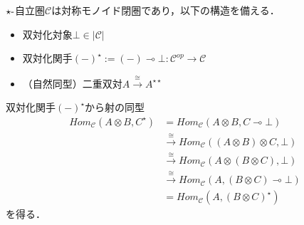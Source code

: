 \documentclass[type_judgement.tex]{subfiles}
\begin{document}

\begin{defn}
\label{def:star-auto}
$\star\mathchar`-$自立圏$\mathcal{C}$は対称モノイド閉圏であり，以下の構造を備える．
\begin{itemize}
    \item 双対化対象$\bot\in|\mathcal{C}|$
    \item 双対化関手$(-)^\star:=(-)\multimap \bot:\mathcal{C}^{op} \rightarrow \mathcal{C}$
    \item （自然同型）二重双対$A \xrightarrow{\cong} A^{\star\star}$
\end{itemize}
\end{defn}

双対化関手$(-)^\star$から射の同型
\begin{align*}
    Hom_\mathcal{C}(A \otimes B, C^\star) &= Hom_\mathcal{C}(A \otimes B, C \multimap \bot) \\
    &\xrightarrow{\cong} Hom_\mathcal{C}((A \otimes B) \otimes C, \bot) \\
    &\xrightarrow{\cong} Hom_\mathcal{C}(A \otimes (B \otimes C),  \bot) \\
    &\xrightarrow{\cong} Hom_\mathcal{C}(A, (B \otimes C) \multimap \bot) \\
    &= Hom_\mathcal{C}(A, (B \otimes C)^\star)
\end{align*}
を得る．
\end{document}
